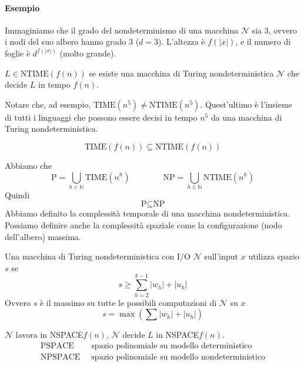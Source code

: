 \paragraph{Esempio} Immaginiamo che il grado del nondeterminismo di una macchina $\mathcal{N}$ sia 3, ovvero i nodi del suo albero hanno grado 3 ($d=3$). L'altezza è $f(|x|)$, e il numero di foglie è $d^{f(|x|)}$ (molto grande).


\begin{definition}
    $L\in\text{NTIME}(f(n))$ se esiste una macchina di Turing nondeterministica $\mathcal{N}$ che decide $L$ in tempo $f(n)$.
\end{definition}
Notare che, ad esempio, $\text{TIME}(n^5)\neq\text{NTIME}(n^5)$. Quest'ultimo è l'insieme di tutti i linguaggi che possono essere decisi in tempo $n^5$ da una macchina di Turing nondeterministica.

\begin{proposition}
    $$
        \text{TIME}(f(n)) \subseteq \text{NTIME}(f(n))
    $$
\end{proposition}
Abbiamo che
$$
    \text{P} = \bigcup_{h\in\mathbb{N}} \text{TIME}(n^h)
    \qquad \qquad 
    \text{NP} = \bigcup_{h\in\mathbb{N}} \text{NTIME}(n^h)
$$
Quindi
$$
    \text{P} \subseteq \text{NP}
$$
Abbiamo definito la complessità temporale di una macchina nondeterministica. Possiamo definire anche la complessità spaziale come la configurazione (nodo dell'albero) massima.
\begin{definition}
    Una macchina di Turing nondeterministica con I/O $\mathcal{N}$ sull'input $x$ utilizza spazio $s$ se 
    $$
        s \geq \sum_{h=2}^{k-1} |w_h| + |u_h|
    $$
    Ovvero $s$ è il massimo su tutte le possibili computazioni di $\mathcal{N}$ su $x$
    $$
        s = \max\left( \sum |w_h| + |u_h| \right)
    $$
\end{definition}
$\mathcal{N}$ lavora in NSPACE$f(n)$, $\mathcal{N}$ decide $L$ in NSPACE$f(n)$.
\begin{align*}
    \text{PSPACE} & ~\text{ spazio polinomiale su modello deterministico}\\
    \text{NPSPACE} & ~\text{ spazio polinomiale su modello nondeterministico} 
\end{align*}


